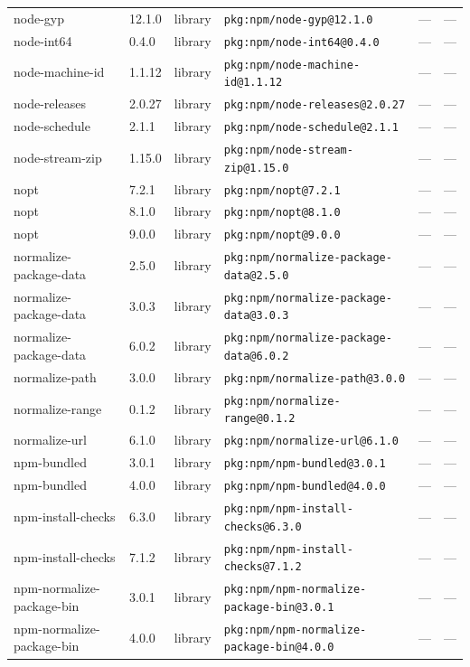 \documentclass[11pt]{article}
\begin{document}
\begin{longtable}{|l|l|l|p{2.2cm}|l|p{4cm}|}
node-gyp & 12.1.0 & library & \texttt{pkg:npm/node-gyp@12.1.0} & — & — \\
node-int64 & 0.4.0 & library & \texttt{pkg:npm/node-int64@0.4.0} & — & — \\
node-machine-id & 1.1.12 & library & \texttt{pkg:npm/node-machine-id@1.1.12} & — & — \\
node-releases & 2.0.27 & library & \texttt{pkg:npm/node-releases@2.0.27} & — & — \\
node-schedule & 2.1.1 & library & \texttt{pkg:npm/node-schedule@2.1.1} & — & — \\
node-stream-zip & 1.15.0 & library & \texttt{pkg:npm/node-stream-zip@1.15.0} & — & — \\
nopt & 7.2.1 & library & \texttt{pkg:npm/nopt@7.2.1} & — & — \\
nopt & 8.1.0 & library & \texttt{pkg:npm/nopt@8.1.0} & — & — \\
nopt & 9.0.0 & library & \texttt{pkg:npm/nopt@9.0.0} & — & — \\
normalize-package-data & 2.5.0 & library & \texttt{pkg:npm/normalize-package-data@2.5.0} & — & — \\
normalize-package-data & 3.0.3 & library & \texttt{pkg:npm/normalize-package-data@3.0.3} & — & — \\
normalize-package-data & 6.0.2 & library & \texttt{pkg:npm/normalize-package-data@6.0.2} & — & — \\
normalize-path & 3.0.0 & library & \texttt{pkg:npm/normalize-path@3.0.0} & — & — \\
normalize-range & 0.1.2 & library & \texttt{pkg:npm/normalize-range@0.1.2} & — & — \\
normalize-url & 6.1.0 & library & \texttt{pkg:npm/normalize-url@6.1.0} & — & — \\
npm-bundled & 3.0.1 & library & \texttt{pkg:npm/npm-bundled@3.0.1} & — & — \\
npm-bundled & 4.0.0 & library & \texttt{pkg:npm/npm-bundled@4.0.0} & — & — \\
npm-install-checks & 6.3.0 & library & \texttt{pkg:npm/npm-install-checks@6.3.0} & — & — \\
npm-install-checks & 7.1.2 & library & \texttt{pkg:npm/npm-install-checks@7.1.2} & — & — \\
npm-normalize-package-bin & 3.0.1 & library & \texttt{pkg:npm/npm-normalize-package-bin@3.0.1} & — & — \\
npm-normalize-package-bin & 4.0.0 & library & \texttt{pkg:npm/npm-normalize-package-bin@4.0.0} & — & — \\

\end{longtable}
\end{document}

